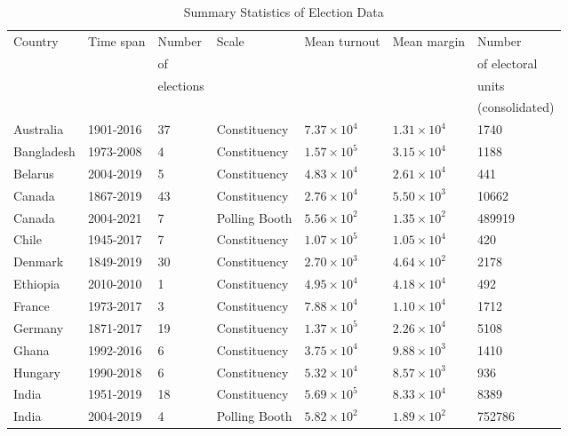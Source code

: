 \begin{table}[h]
    \centering
    \caption{Summary Statistics of Election Data}
    \label{tab:election_stats}
    {\scriptsize
    \begin{tabular}{|l|l|l|l|l|l|l|}
    \hline
    Country & Time span & Number & Scale    & Mean turnout & Mean margin & Number \\ 
     &  & of  &  &  &  & of electoral \\ 
     &  & elections  &  &  &  & units \\ 
     &  &  &  &  &  & (consolidated) \\ \hline
    Australia & 1901-2016 & 37 & Constituency & $7.37\times 10^{4}$ & $1.31\times 10^{4}$ & 1740\\ \hline
    Bangladesh & 1973-2008 & 4 & Constituency & $1.57\times 10^{5}$ & $3.15\times 10^{4}$ & 1188\\ \hline
    Belarus & 2004-2019 & 5 & Constituency & $4.83\times 10^{4}$ & $2.61\times 10^{4}$ & 441\\ \hline
    Canada & 1867-2019 & 43 & Constituency & $2.76\times 10^{4}$ & $5.50\times 10^{3}$ & 10662\\ \hline
    Canada & 2004-2021 & 7 & Polling Booth & $5.56\times 10^{2}$ & $1.35\times 10^{2}$ & 489919\\ \hline
    Chile & 1945-2017 & 7 & Constituency & $1.07\times 10^{5}$ & $1.05\times 10^{4}$ & 420\\ \hline
    Denmark & 1849-2019 & 30 & Constituency & $2.70\times 10^{3}$ & $4.64\times 10^{2}$ & 2178\\ \hline
    Ethiopia & 2010-2010 & 1 & Constituency & $4.95\times 10^{4}$ & $4.18\times 10^{4}$ & 492\\ \hline
    France & 1973-2017 & 3 & Constituency & $7.88\times 10^{4}$ & $1.10\times 10^{4}$ & 1712\\ \hline
    Germany & 1871-2017 & 19 & Constituency & $1.37\times 10^{5}$ & $2.26\times 10^{4}$ & 5108\\ \hline
    Ghana & 1992-2016 & 6 & Constituency & $3.75\times 10^{4}$ & $9.88\times 10^{3}$ & 1410\\ \hline
    Hungary & 1990-2018 & 6 & Constituency & $5.32\times 10^{4}$ & $8.57\times 10^{3}$ & 936\\ \hline
    India & 1951-2019 & 18 & Constituency & $5.69\times 10^{5}$ & $8.33\times 10^{4}$ & 8389\\ \hline
    India & 2004-2019 & 4 & Polling Booth & $5.82\times 10^{2}$ & $1.89\times 10^{2}$ & 752786\\ \hline

\end{tabular}}
\end{table}
